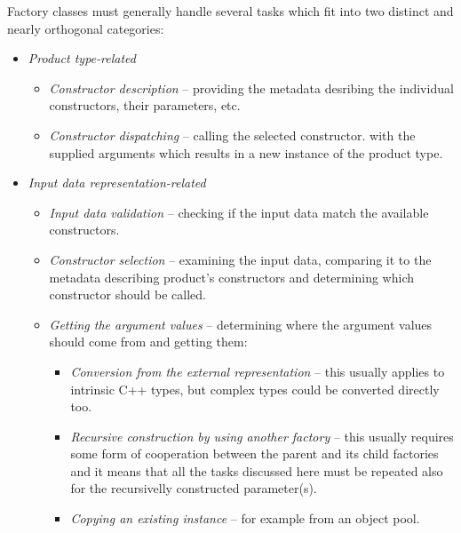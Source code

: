 Factory classes must generally handle several tasks
which fit into two distinct and nearly orthogonal categories:

\begin{itemize}
\item{\emph{Product type-related}}
        \begin{itemize}
        \item{\emph{Constructor description}} -- providing the metadata desribing
        the individual constructors, their parameters, etc.
        \item{\emph{Constructor dispatching}} -- calling the selected constructor.
        with the supplied arguments which results in a new instance of the product type.
        \end{itemize}

\item{\emph{Input data representation-related}}
        \begin{itemize}
        \item{\emph{Input data validation}} -- checking if the input data match
        the available constructors.
        \item{\emph{Constructor selection}} -- examining the input data, comparing it
        to the metadata describing product's constructors and determining
        which constructor should be called.
        \item{\emph{Getting the argument values}} -- determining where the argument
        values should come from and getting them:
                \begin{itemize}
                \item{\emph{Conversion from the external representation}} -- this usually applies
                to intrinsic C++ types, but complex types could be converted directly too.
                \item{\emph{Recursive construction by using another factory}} -- this usually
                requires some form of cooperation between the parent and its child factories
                and it means that all the tasks discussed here must be repeated also for
                the recursivelly constructed parameter(s).
                \item{\emph{Copying an existing instance}} -- for example from an object pool.
                \end{itemize}
        \end{itemize}
\end{itemize}

